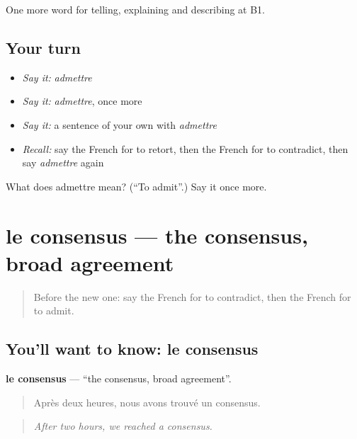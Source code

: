 \begin{grammarlens}[title={What you've built}]
One more word for telling, explaining and describing at B1.
\end{grammarlens}

\subsection*{Your turn}
\begin{itemize}
\raggedright
  \item \emph{Say it:} \emph{admettre}
  \item \emph{Say it:} \emph{admettre}, once more
  \item \emph{Say it:} a sentence of your own with \emph{admettre}
  \item \emph{Recall:} say the French for to retort, then the French for to contradict, then say \emph{admettre} again
\end{itemize}

\begin{tcolorbox}[breakable,colback=teal!4,colframe=teal!35!black,title={Before you move on}]
What does admettre mean? (\textquotedblleft{}To admit\textquotedblright{}.) Say it once more.
\end{tcolorbox}
\section[le consensus]{le consensus — the consensus, broad agreement}

\label{lesson:FR-C337-consensus}



\begin{quote}
Before the new one: say the French for to contradict, then the French for to admit.
\end{quote}

\subsection*{You'll want to know: le consensus}
\textbf{le consensus} — \textquotedblleft{}the consensus, broad agreement\textquotedblright{}.

\begin{quote}
Après deux heures, nous avons trouvé un consensus.
\end{quote}

\begin{quote}
\emph{After two hours, we reached a consensus.}
\end{quote}

